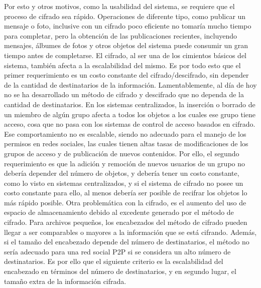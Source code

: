     Por esto y otros motivos, como la usabilidad del sistema, se requiere que el
    proceso de cifrado sea rápido. Operaciones de diferente tipo, como
    publicar un mensaje o foto, inclusive con un cifrado poco eficiente no
    tomaría mucho tiempo para completar, pero la obtención de las publicaciones
    recientes, incluyendo mensajes, álbumes de fotos y otros objetos del sistema
    puede consumir un gran tiempo antes de completarse.
    El cifrado, al ser una de los cimientos básicos del sistema, también
    afecta a la escalabilidad del mismo. Es por todo esto que el primer
    requerimiento es un costo constante del cifrado/descifrado, sin
    depender de la cantidad de destinatarios de la información. Lamentablemente, al
    día de hoy no se ha desarrollado un método de cifrado y descifrado
    que no dependa de la cantidad de destinatarios.
    En los sistemas centralizados, la inserción o borrado de un miembro de algún
    grupo afecta a todos los objetos a los cuales ese grupo tiene acceso, cosa que
    no pasa con los sistemas de control de acceso basados en cifrado.  Ese
    comportamiento no es escalable, siendo no adecuado para el
    manejo de los permisos en redes sociales, las cuales tienen altas tasas de
    modificaciones de los grupos de acceso y de publicación de nuevos contenidos.
    Por ello, el segundo requerimiento es que la adición y remoción de nuevos
    usuarios de un grupo no debería depender del número de objetos, y debería tener
    un costo constante, como lo visto en sistemas centralizados, y si el sistema de
    cifrado no posee un costo constante para ello, al menos debería ser
    posible de recifrar los objetos lo más rápido posible.
    Otra problemática con la cifrado, es el aumento del uso de espacio de
    almacenamiento debido al excedente generado por el método de cifrado. Para archivos pequeños, los encabezados del método de
    cifrado pueden llegar a ser comparables o mayores a la información que se
    está cifrando. Además, si el tamaño del encabezado depende del número de
    destinatarios, el método no sería adecuado para una red social P2P si se
    considera un alto número de destinatarios. Es por ello que el siguiente
    criterio es la escalabilidad del encabezado en términos del número de
    destinatarios, y en segundo lugar, el tamaño extra de la información
    cifrada.
    
